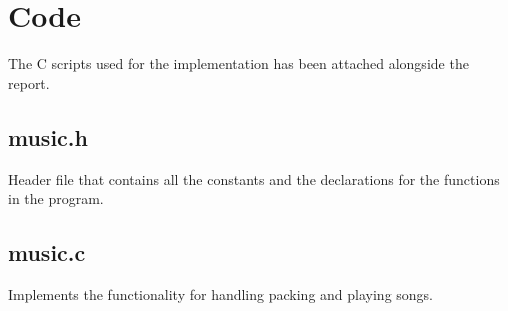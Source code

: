 \documentclass[usletter, 12pt]{article}
\begin{document}
    \section{Code}

        The C scripts used for the implementation has been attached alongside the report.

        \subsection{music.h}
        Header file that contains all the constants and the declarations for the functions in the program.

        \subsection{music.c}
        Implements the functionality for handling packing and playing songs.
\end{document}
